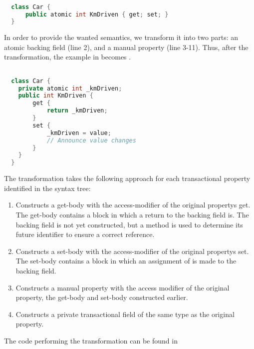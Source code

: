 \begin{lstlisting}[label=lst:before_atomic_property,
  caption={Before Transformation},
  language=Java,  
  showspaces=false,
  showtabs=false,
  breaklines=true,
  showstringspaces=false,
  breakatwhitespace=true,
  commentstyle=\color{greencomments},
  keywordstyle=\color{bluekeywords},
  stringstyle=\color{redstrings},
  morekeywords={atomic, retry, orElse, var, get, set}]  % Start your code-block

  class Car {
      public atomic int KmDriven { get; set; }
  }
\end{lstlisting}

In order to provide the wanted semantics, we transform it into two parts: an atomic backing field (line 2), and a manual property (line 3-11). Thus, after the transformation, the example in  becomes . 

\begin{lstlisting}[label=lst:after_atomic_property,
  caption={After Transformation},
  language=Java,  
  showspaces=false,
  showtabs=false,
  breaklines=true,
  showstringspaces=false,
  breakatwhitespace=true,
  commentstyle=\color{greencomments},
  keywordstyle=\color{bluekeywords},
  stringstyle=\color{redstrings},
  morekeywords={atomic, retry, orElse, var, get, set}]  % Start your code-block

  class Car {
    private atomic int _kmDriven;
    public int KmDriven {
        get {
            return _kmDriven;
        }
        set {
            _kmDriven = value;
            // Announce value changes
        }
    }
  }
\end{lstlisting}

The transformation takes the following approach for each transactional property identified in the syntax tree:

\begin{enumerate}
	\item Constructs a get-body with the access-modifier of the original propertys get. The get-body contains a block in which a return to the backing field is. The backing field is not yet constructed, but a method is used to determine its future identifier to ensure a correct reference.
	\item Constructs a set-body with the access-modifier of the original propertys set. The set-body contains a block in which an assignment of  is made to the backing field.
	\item Constructs a manual property with the access modifier of the original property, the get-body and set-body constructed earlier.
	\item Constructs a private transactional field of the same type as the original property.
\end{enumerate}
The code performing the transformation can be found in 

